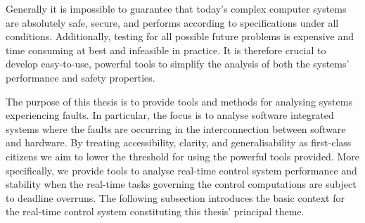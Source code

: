 Generally it is impossible to guarantee that today's complex computer systems are absolutely safe, secure, and performs according to specifications under all conditions.
Additionally, testing for all possible future problems is expensive and time consuming at best and infeasible in practice.
It is therefore crucial to develop easy-to-use, powerful tools to simplify the analysis of both the systems' performance and safety properties.

The purpose of this thesis is to provide tools and methods for analysing systems experiencing faults.
In particular, the focus is to analyse software integrated systems where the faults are occurring in the interconnection between software and hardware.
By treating accessibility, clarity, and generalisability as first-class citizens we aim to lower the threshold for using the powerful tools provided.
More specifically, we provide tools to analyse real-time control system performance and stability when the real-time tasks governing the control computations are subject to deadline overruns.
The following subsection introduces the basic context for the real-time control system constituting this thesis' principal theme.


